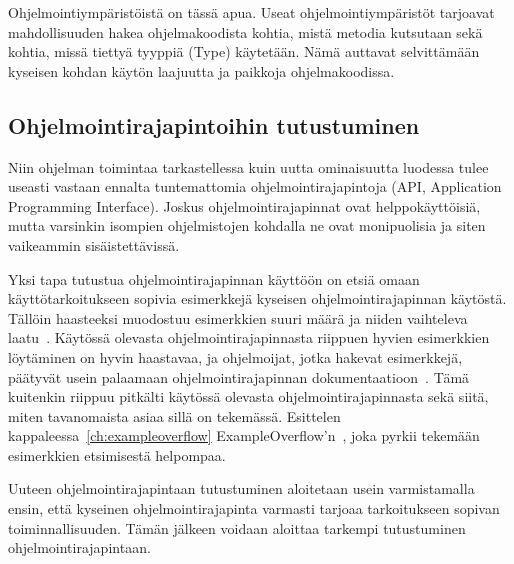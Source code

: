 \documentclass[finnish]{tktltiki2}
\theoremstyle{definition}
\theoremstyle{remark}
\begin{document}
Ohjelmointiympäristöistä on tässä apua. Useat ohjelmointiympäristöt tarjoavat mahdollisuuden hakea ohjelmakoodista kohtia, mistä metodia kutsutaan sekä kohtia, missä tiettyä tyyppiä (Type) käytetään. Nämä auttavat selvittämään kyseisen kohdan käytön laajuutta ja paikkoja ohjelmakoodissa.


\subsection{Ohjelmointirajapintoihin tutustuminen}
Niin ohjelman toimintaa tarkastellessa kuin uutta ominaisuutta luodessa tulee useasti vastaan ennalta tuntemattomia ohjelmointirajapintoja (API, Application Programming Interface).
Joskus ohjelmointirajapinnat ovat helppokäyttöisiä, mutta varsinkin isompien ohjelmistojen kohdalla ne ovat monipuolisia ja siten vaikeammin sisäistettävissä.

Yksi tapa tutustua ohjelmointirajapinnan käyttöön on etsiä omaan käyttötarkoitukseen sopivia esimerkkejä kyseisen ohjelmointirajapinnan käytöstä. Tällöin haasteeksi muodostuu esimerkkien suuri määrä ja niiden vaihteleva laatu~\cite{example-overflow-social-media-for-code-recommendations}. Käytössä olevasta ohjelmointirajapinnasta riippuen hyvien esimerkkien löytäminen on hyvin haastavaa, ja ohjelmoijat, jotka hakevat esimerkkejä, päätyvät usein palaamaan ohjelmointirajapinnan dokumentaatioon~\cite{asking-and-answering-api-questions}. Tämä kuitenkin riippuu pitkälti käytössä olevasta ohjelmointirajapinnasta sekä siitä, miten tavanomaista asiaa sillä on tekemässä. Esittelen kappaleessa~\ref{ch:exampleoverflow} ExampleOverflow'n~\cite{example-overflow-social-media-for-code-recommendations}, joka pyrkii tekemään esimerkkien etsimisestä helpompaa.

Uuteen ohjelmointirajapintaan tutustuminen aloitetaan usein varmistamalla ensin, että kyseinen ohjelmointirajapinta varmasti tarjoaa tarkoitukseen sopivan toiminnallisuuden. Tämän jälkeen voidaan aloittaa tarkempi tutustuminen ohjelmointirajapintaan.
\end{document}

